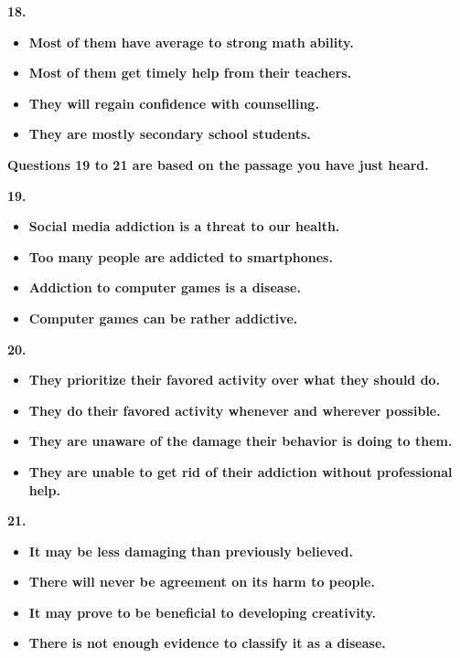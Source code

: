 \documentclass[UTF8,11pt]{ctexart}
\begin{document}
\textbf{18.}


\begin{itemize}[leftmargin=2em,itemsep=.2em,topsep=.4em]\item[A.] \textbf{Most of them have average to strong math ability.}
\item[B.] \textbf{Most of them get timely help from their teachers.}
\item[C.] \textbf{They will regain confidence with counselling.}
\item[D.] \textbf{They are mostly secondary school students.}
\end{itemize}

\textbf{Questions 19 to 21 are based on the passage you have just heard.}


\textbf{19.}


\begin{itemize}[leftmargin=2em,itemsep=.2em,topsep=.4em]\item[A.] \textbf{Social media addiction is a threat to our health.}
\item[B.] \textbf{Too many people are addicted to smartphones.}
\item[C.] \textbf{Addiction to computer games is a disease.}
\item[D.] \textbf{Computer games can be rather addictive.}
\end{itemize}

\textbf{20.}


\begin{itemize}[leftmargin=2em,itemsep=.2em,topsep=.4em]\item[A.] \textbf{They prioritize their favored activity over what they should do.}
\item[B.] \textbf{They do their favored activity whenever and wherever possible.}
\item[C.] \textbf{They are unaware of the damage their behavior is doing to them.}
\item[D.] \textbf{They are unable to get rid of their addiction without professional help.}
\end{itemize}

\textbf{21.}


\begin{itemize}[leftmargin=2em,itemsep=.2em,topsep=.4em]\item[A.] \textbf{It may be less damaging than previously believed.}
\item[B.] \textbf{There will never be agreement on its harm to people.}
\item[C.] \textbf{It may prove to be beneficial to developing creativity.}
\item[D.] \textbf{There is not enough evidence to classify it as a disease.}
\end{itemize}
\end{document}

